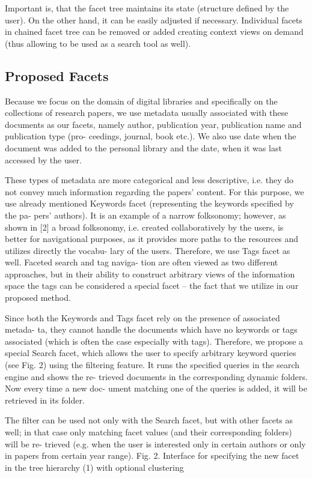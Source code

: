 \documentclass{llncs}
\begin{document}
Important is, that the facet tree maintains its state (structure defined by the user). On the other hand, it can be easily adjusted if necessary. Individual facets in chained facet tree can be removed or added creating context views on demand (thus allowing to be used as a search tool as well).

\subsection{Proposed Facets}
Because we focus on the domain of digital libraries and specifically on the collections of research papers, we use metadata usually associated with these documents as our facets, namely author, publication year, publication name and publication type (pro- ceedings, journal, book etc.). We also use date when the document was added to the personal library and the date, when it was last accessed by the user.

These types of metadata are more categorical and less descriptive, i.e. they do not convey much information regarding the papers’ content. For this purpose, we use already mentioned Keywords facet (representing the keywords specified by the pa- pers’ authors). It is an example of a narrow folksonomy; however, as shown in [2] a broad folksonomy, i.e. created collaboratively by the users, is better for navigational purposes, as it provides more paths to the resources and utilizes directly the vocabu- lary of the users. Therefore, we use Tags facet as well. Faceted search and tag naviga- tion are often viewed as two different approaches, but in their ability to construct arbitrary views of the information space the tags can be considered a special facet – the fact that we utilize in our proposed method.

Since both the Keywords and Tags facet rely on the presence of associated metada- ta, they cannot handle the documents which have no keywords or tags associated (which is often the case especially with tags). Therefore, we propose a special Search facet, which allows the user to specify arbitrary keyword queries (see Fig. 2) using the filtering feature. It runs the specified queries in the search engine and shows the re- trieved documents in the corresponding dynamic folders. Now every time a new doc- ument matching one of the queries is added, it will be retrieved in its folder.

The filter can be used not only with the Search facet, but with other facets as well; in that case only matching facet values (and their corresponding folders) will be re- trieved (e.g. when the user is interested only in certain authors or only in papers from certain year range).
Fig. 2. Interface for specifying the new facet in the tree hierarchy (1) with optional clustering
\end{document}
